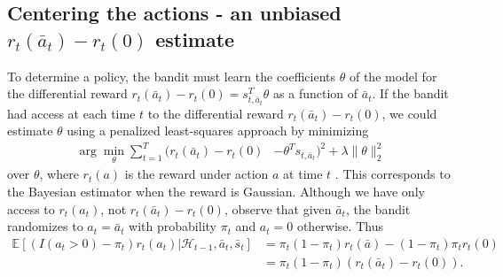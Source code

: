 \documentclass{article}
\begin{document}



 

\subsection{Centering the actions - an unbiased $r_t(\bar{a}_t) - r_t(0)$ estimate}
To determine a policy, the bandit must learn the coefficients $\theta$ of the model for the differential reward $r_t(\bar{a}_t) - r_t(0) = s_{t,\bar{a}_t}^T\theta$ as a function of $\bar{a}_t$. If the bandit had access at each time $t$ to the differential reward $r_t(\bar{a}_t) - r_t(0)$, we could estimate $\theta$ using a penalized least-squares approach by minimizing 
\begin{align*}%
\arg \min_{\theta} \sum\nolimits_{t=1}^T (r_t (\bar{a}_t) - r_t(0) &- \theta^T s_{t,\bar{a}_t} )^2 + \lambda\|\theta\|_2^2%
\end{align*}
over $\theta$, where $r_t(a)$ is the reward under action $a$ at time $t$ \citep{agrawal2013thompson}. This corresponds to the Bayesian estimator when the reward is Gaussian. %
Although we have only access to $r_t(a_t)$, not $r_t(\bar{a}_t) - r_t(0)$, 
observe that given $\bar{a}_t$, the bandit randomizes to $a_t = \bar{a}_t$ with probability $\pi_t$ and $a_t = 0$ otherwise. Thus
\begin{align}\label{eq:ExpR}
\mathbb{E}[(I(a_t>0) - \pi_t) r_t(a_t) | \mathcal{H}_{t-1},\bar{a}_t,\bar{s}_t] &= \pi_t(1-\pi_t) r_t(\bar{a}) - (1- \pi_t) \pi_t r_t(0)\\\nonumber
& = \pi_t(1-\pi_t) (r_t(\bar{a}_t) -  r_t(0)).
\end{align}
\end{document}
